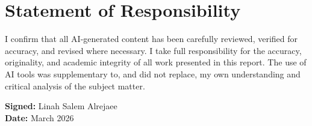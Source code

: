 \documentclass[12pt,a4paper]{report}
\begin{document}
\section*{Statement of Responsibility}

I confirm that all AI-generated content has been carefully reviewed, verified for accuracy, and revised where necessary. I take full responsibility for the accuracy, originality, and academic integrity of all work presented in this report. The use of AI tools was supplementary to, and did not replace, my own understanding and critical analysis of the subject matter.

\vspace{1cm}
\noindent\textbf{Signed:} Linah Salem Alrejaee \\
\textbf{Date:} March 2026
\end{document}
